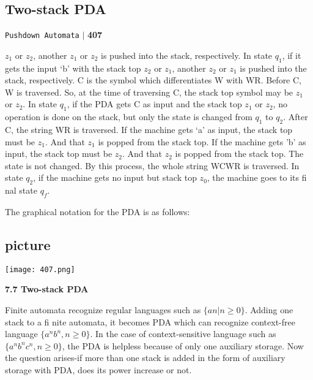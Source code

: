 \documentclass[9pt]{beamer}
\begin{document}
\begin{frame}
\section*{Two-stack PDA}
\begin{flushright}
 \texttt{Pushdown Automata} \hspace*{0.10cm}\textbf{$|$} \textbf{407}\hspace*{0.5cm}
\end{flushright}

\vspace*{0.5cm}
$z_1$ or $z_2$, another $z_1$ or $z_2$ is pushed into the stack, respectively. In state $q_1$, if it gets the input ‘b’ with the
stack top $z_2$ or $z_1$, another $z_2$ or $z_1$ is pushed into the stack, respectively.
\hspace*{0.5cm} C is the symbol which differentiates W with WR. Before C, W is traversed. So, at the time of traversing
C, the stack top symbol may be $z_1$ or $z_2$. In state $q_1$, if the PDA gets C as input and the stack top $z_1$ or
$z_2$, no operation is done on the stack, but only the state is changed from $q_1$ to $q_2$. After C, the string WR is
traversed. If the machine gets ‘a’ as input, the stack top must be $z_1$. And that $z_1$ is popped from the stack
top. If the machine gets 'b' as input, the stack top must be $z_2$. And that $z_2$ is popped from the stack top.
The state is not changed. By this process, the whole string WCWR is traversed. In state $q_2$, if the machine
gets no input but stack top $z_0$, the machine goes to its fi nal state $q_f$.\\
\end{frame}

\begin{frame}
The graphical notation for the PDA is as follows:\\

\vspace*{0.3cm}
\begin{center}
\section{picture}
\texttt{[image: 407.png]}
\end{center}

\large{
\textbf{7.7 Two-stack PDA}
}

\small{
Finite automata recognize regular languages such as $\{an | n \geq 0\}$. Adding one stack to a fi nite automata, it
becomes PDA which can recognize context-free language $\{a^nb^n, n \geq 0\}$. In the case of context-sensitive
language such as $\{a^nb^n c^n, n \geq 0\}$, the PDA is helpless because of only one auxiliary storage. Now the
question arises-if more than one stack is added in the form of auxiliary storage with PDA, does its
power increase or not.}\\
\end{frame}
\end{document}
